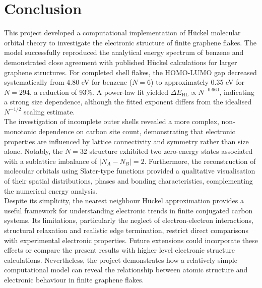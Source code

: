 \chapter{Conclusion}
\label{ch:Conclusion}

\noindent This project developed a computational implementation of H\"uckel molecular orbital theory to investigate the electronic structure of finite graphene flakes. The model successfully reproduced the analytical energy spectrum of benzene and demonstrated close agreement with published H\"uckel calculations for larger graphene structures. For completed shell flakes, the HOMO-LUMO gap decreased systematically from 4.80 eV for benzene ($N=6$) to approximately 0.35 eV for $N=294$, a reduction of 93\%. A power-law fit yielded $\Delta E_{\mathrm{HL}}\propto N^{-0.660}$, indicating a strong size dependence, although the fitted exponent differs from the idealised $N^{-1/2}$ scaling estimate. \\

\noindent The investigation of incomplete outer shells revealed a more complex, non-monotonic dependence on carbon site count, demonstrating that electronic properties are influenced by lattice connectivity and symmetry rather than size alone. Notably, the $N=32$ structure exhibited two zero-energy states associated with a sublattice imbalance of $|N_A-N_B|=2$. Furthermore, the reconstruction of molecular orbitals using Slater-type functions provided a qualitative visualisation of their spatial distributions, phases and bonding characteristics, complementing the numerical energy analysis. \\

\noindent Despite its simplicity, the nearest neighbour H\"uckel approximation provides a useful framework for understanding electronic trends in finite conjugated carbon systems. Its limitations, particularly the neglect of electron-electron interactions, structural relaxation and realistic edge termination, restrict direct comparisons with experimental electronic properties. Future extensions could incorporate these effects or compare the present results with higher level electronic structure calculations. Nevertheless, the project demonstrates how a relatively simple computational model can reveal the relationship between atomic structure and electronic behaviour in finite graphene flakes.
